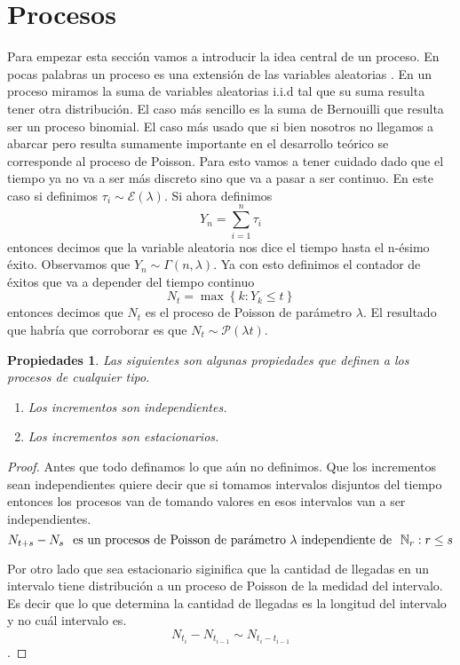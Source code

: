 \documentclass[11pt]{article}
\theoremstyle{plain} %
\newtheorem*{props}{\color{rojo} Propiedades}
\theoremstyle{definition}
\theoremstyle{remark}
\def\N{\mathbb{N}}
\def\vas{variables aleatorias }
\def\blue{\textcolor{blue!60!black}}
\begin{document}
\bigskip
\section{Procesos}
Para empezar esta sección vamos a introducir la idea central de un proceso. En pocas palabras un proceso es una extensión de las \vas. En un proceso miramos la suma de \vas i.i.d tal que su suma resulta tener otra distribución. El caso más sencillo es la suma de Bernouilli que resulta ser un \blue{proceso binomial}. El caso más usado que si bien nosotros no llegamos a abarcar pero resulta sumamente importante en el desarrollo teórico se corresponde al \blue{proceso de Poisson}. Para esto vamos a tener cuidado dado que el tiempo ya no va a ser más discreto sino que va a pasar a ser continuo. En este caso si definimos $\tau_i \sim \mathcal{E}(\lambda) $. Si ahora definimos 
\[ Y_n = \sum_{i=1}^{n} \tau_i \]
entonces decimos que la variable aleatoria nos dice el tiempo hasta el n-ésimo éxito. Observamos que $Y_n \sim \Gamma(n,\lambda)$. Ya con esto definimos el contador de éxitos que va a depender del tiempo continuo
\[ N_t = \max \left\lbrace k: Y_k \leq t \right\rbrace  \]
entonces decimos que $N_t$ es el proceso de Poisson de parámetro $\lambda$. El resultado que habría que corroborar es que $N_t \sim \mathcal{P}(\lambda t)$.

\begin{props}
	Las siguientes son algunas propiedades que definen a los procesos de cualquier tipo.
	\begin{enumerate}
		\item Los incrementos son independientes.
		\item Los incrementos son estacionarios.
	\end{enumerate}
\end{props}

\begin{proof}
	Antes que todo definamos lo que aún no definimos. Que los incrementos sean independientes quiere decir que si tomamos intervalos disjuntos del tiempo entonces los procesos van de tomando valores en esos intervalos van a ser independientes.
	\[ N_{t+s} - N_{s} \hspace{0.25cm} \text{es un procesos de Poisson de parámetro $\lambda$ independiente de} \hspace{0.25cm} \N_{r} : r \leq s \]
	
	Por otro lado que sea estacionario siginifica que la cantidad de llegadas en un intervalo tiene distribución a un proceso de Poisson de la medidad del intervalo. Es decir que lo que determina la cantidad de llegadas es la longitud del intervalo y no cuál intervalo es.
	\[ N_{t_i} - N_{t_{i-1}} \sim N_{t_i - t_{i-1}} \].
	
	
\end{proof}
\end{document}
